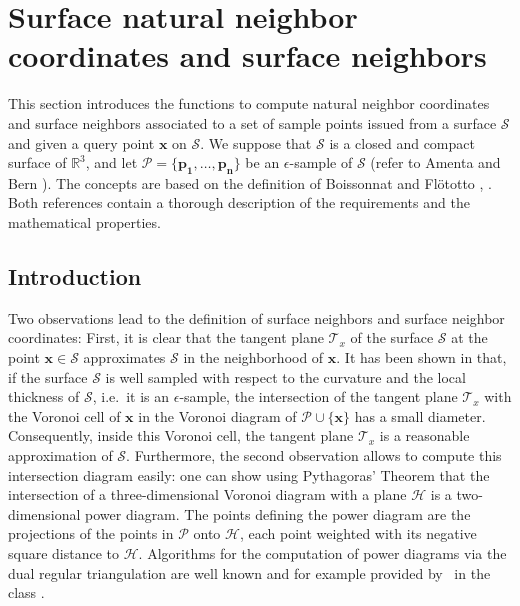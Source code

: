 \section{Surface natural neighbor coordinates and surface neighbors}\label{sec:surface}

This section introduces the functions to compute natural neighbor
coordinates and surface neighbors associated to a set of sample points
issued from a surface $\mathcal{S}$ and given a query point
$\mathbf{x}$ on $\mathcal{S}$. We suppose that $\mathcal{S}$ is a
closed and compact surface of $\mathbb{R}^3$, and let $\mathcal{P}=
\{\mathbf{p_1}, \ldots,\mathbf{p_n}\}$ be an $\epsilon$-sample of
$\mathcal{S}$ (refer to Amenta and Bern \cite{ab-srvf-99}). The
concepts are based on the definition of Boissonnat and Fl\"ototto
\cite{bf-lcss-02}, \cite{cgal:f-csapc-03}.  Both references
contain a thorough description of the requirements and the
mathematical properties.

\subsection{Introduction}

Two observations lead to the definition of surface neighbors and
surface neighbor coordinates: First, it is clear that the tangent
plane $\mathcal{T}_x$ of the surface $\mathcal{S}$ at the point
$\mathbf{x} \in \mathcal{S}$ approximates $\mathcal{S}$ in the
neighborhood of $\mathbf{x}$. It has been shown in \cite{bf-lcss-02}
that, if the surface $\mathcal{S}$ is well sampled with respect to the
curvature and the local thickness of $\mathcal{S}$, i.e.\ it is an $\epsilon$-sample, the intersection
of the tangent plane $\mathcal{T}_x$ with the Voronoi cell of
$\mathbf{x}$ in the Voronoi diagram of $\mathcal{P} \cup
\{\mathbf{x}\}$ has a small diameter.  Consequently, inside this
Voronoi cell, the tangent plane $\mathcal{T}_x$ is a reasonable
approximation of $\mathcal{S}$. Furthermore, the second observation
allows to compute this intersection diagram easily: one can show using
Pythagoras' Theorem that the intersection of a three-dimensional
Voronoi diagram with a plane $\mathcal{H}$ is a two-dimensional power
diagram. The points defining the power diagram are the projections of
the points in $\mathcal{P}$ onto $\mathcal{H}$, each point weighted
with its negative square distance to $\mathcal{H}$. Algorithms for the
computation of power diagrams via the dual regular triangulation are
well known and for example provided by \cgal\ in the class
.


